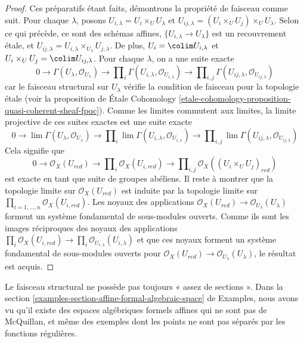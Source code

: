 \begin{proof}
\medskip\noindent
Ces préparatifs étant faits, démontrons la propriété de
faisceau comme suit. Pour chaque $\lambda$, posons
$U_{i, \lambda} = U_i \times_U U_\lambda$ et
$U_{ij, \lambda} = (U_i \times_U U_j) \times_U U_\lambda$.
Selon ce qui précède, ce sont des schémas affines, $\{U_{i, \lambda} \to U_\lambda\}$
est un recouvrement \'etale, et
$U_{ij, \lambda} = U_{i, \lambda} \times_{U_\lambda} U_{j, \lambda}$.
De plus, $U_i = \colim U_{i, \lambda}$ et
$U_i \times_U U_j = \colim U_{ij, \lambda}$.
Pour chaque $\lambda$, on a une suite exacte
$$
0 \to
\Gamma(U_\lambda, \mathcal{O}_{U_\lambda}) \to
\prod\nolimits_i \Gamma(U_{i, \lambda}, \mathcal{O}_{U_{i, \lambda}}) \to
\prod\nolimits_{i, j} \Gamma(U_{ij, \lambda}, \mathcal{O}_{U_{ij, \lambda}})
$$
car le faisceau structural sur $U_\lambda$ vérifie la condition de faisceau
pour la topologie \'etale
(voir la proposition de \'Etale Cohomology
\ref{etale-cohomology-proposition-quasi-coherent-sheaf-fpqc}).
Comme les limites commutent aux limites, la limite projective de ces
suites exactes est une suite exacte
$$
0 \to
\lim \Gamma(U_\lambda, \mathcal{O}_{U_\lambda}) \to
\prod\nolimits_i \lim \Gamma(U_{i, \lambda}, \mathcal{O}_{U_{i, \lambda}}) \to
\prod\nolimits_{i, j} \lim
\Gamma(U_{ij, \lambda}, \mathcal{O}_{U_{ij, \lambda}})
$$
Cela signifie que
$$
0 \to
\mathcal{O}_X(U_{red}) \to
\prod\nolimits_i \mathcal{O}_X(U_{i, red}) \to
\prod\nolimits_{i, j} \mathcal{O}_X((U_i \times_U U_j)_{red})
$$
est exacte en tant que suite de groupes abéliens. Il reste à
montrer que la topologie limite sur $\mathcal{O}_X(U_{red})$ est induite
par la topologie limite sur
$\prod_{i = 1, \ldots, n} \mathcal{O}_X(U_{i, red})$.
Les noyaux des applications
$\mathcal{O}_X(U_{red}) \to \mathcal{O}_{U_\lambda}(U_\lambda)$
forment un système fondamental de sous-modules ouverts. Comme ils sont les images
réciproques des noyaux des applications
$\prod_i \mathcal{O}_X(U_{i, red}) \to
\prod_i \mathcal{O}_{U_{i, \lambda}}(U_{i, \lambda})$
et que ces noyaux forment un système fondamental de sous-modules ouverts
pour $\mathcal{O}_X(U_{red}) \to \mathcal{O}_{U_\lambda}(U_\lambda)$,
le résultat est acquis.
\end{proof}

\begin{remark}
\label{remark-not-enough-sections}
Le faisceau structural ne possède pas toujours « assez de sections ».
Dans la section \ref{examples-section-affine-formal-algebraic-space} de Examples,
nous avons vu qu'il existe des espaces algébriques formels affines qui
ne sont pas de McQuillan, et même des exemples dont les points ne sont pas
séparés par les fonctions régulières.
\end{remark}

